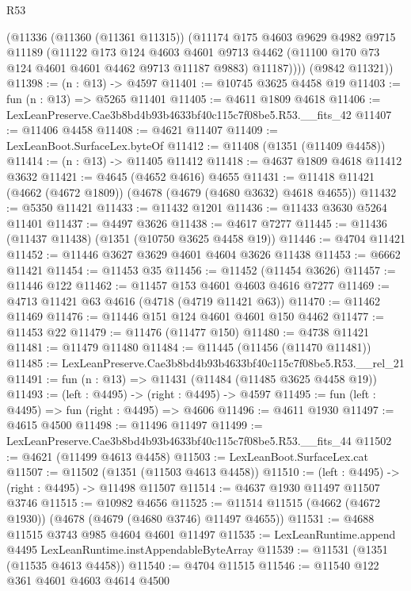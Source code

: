 \begin{lexlean}{R53}
\begin{coremodule}
        (@11336
          (@11360 (@11361 @11315))
          (@11174
            @175
            @4603
            @9629
            @4982
            @9715
            @11189
            (@11122
              @173
              @124
              @4603
              @4601
              @9713
              @4462
              (@11100 @170 @73 @124 @4601 @4601 @4462 @9713 @11187 @9883)
              @11187))))
      (@9842 @11321))
@11398 := (n : @13) -> @4597
@11401 := @10745 @3625 @4458 @19
@11403 := fun (n : @13) => @5265 @11401
@11405 := @4611 @1809 @4618
@11406 := LexLeanPreserve.Cae3b8bd4b93b4633bf40c115c7f08be5.R53.__fits_42
@11407 := @11406 @4458
@11408 := @4621 @11407
@11409 := LexLeanBoot.SurfaceLex.byteOf
@11412 := @11408 (@1351 (@11409 @4458))
@11414 := (n : @13) -> @11405 @11412
@11418 := @4637 @1809 @4618 @11412 @3632
@11421 := @4645 (@4652 @4616) @4655
@11431 := @11418 @11421 (@4662 (@4672 @1809)) (@4678 (@4679 (@4680 @3632) @4618 @4655))
@11432 := @5350 @11421
@11433 := @11432 @1201
@11436 := @11433 @3630 @5264 @11401
@11437 := @4497 @3626
@11438 := @4617 @7277
@11445 := @11436 (@11437 @11438) (@1351 (@10750 @3625 @4458 @19))
@11446 := @4704 @11421
@11452 := @11446 @3627 @3629 @4601 @4604 @3626 @11438
@11453 := @6662 @11421
@11454 := @11453 @35
@11456 := @11452 (@11454 @3626)
@11457 := @11446 @122
@11462 := @11457 @153 @4601 @4603 @4616 @7277
@11469 := @4713 @11421 @63 @4616 (@4718 (@4719 @11421 @63))
@11470 := @11462 @11469
@11476 := @11446 @151 @124 @4601 @4601 @150 @4462
@11477 := @11453 @22
@11479 := @11476 (@11477 @150)
@11480 := @4738 @11421
@11481 := @11479 @11480
@11484 := @11445 (@11456 (@11470 @11481))
@11485 := LexLeanPreserve.Cae3b8bd4b93b4633bf40c115c7f08be5.R53.__rel_21
@11491 := fun (n : @13) => @11431 (@11484 (@11485 @3625 @4458 @19))
@11493 := (left : @4495) -> (right : @4495) -> @4597
@11495 := fun (left : @4495) => fun (right : @4495) => @4606
@11496 := @4611 @1930
@11497 := @4615 @4500
@11498 := @11496 @11497
@11499 := LexLeanPreserve.Cae3b8bd4b93b4633bf40c115c7f08be5.R53.__fits_44
@11502 := @4621 (@11499 @4613 @4458)
@11503 := LexLeanBoot.SurfaceLex.cat
@11507 := @11502 (@1351 (@11503 @4613 @4458))
@11510 := (left : @4495) -> (right : @4495) -> @11498 @11507
@11514 := @4637 @1930 @11497 @11507 @3746
@11515 := @10982 @4656
@11525 := @11514 @11515 (@4662 (@4672 @1930)) (@4678 (@4679 (@4680 @3746) @11497 @4655))
@11531 := @4688 @11515 @3743 @985 @4604 @4601 @11497
@11535 := LexLeanRuntime.append @4495 LexLeanRuntime.instAppendableByteArray
@11539 := @11531 (@1351 (@11535 @4613 @4458))
@11540 := @4704 @11515
@11546 := @11540 @122 @361 @4601 @4603 @4614 @4500

\end{coremodule}
\end{lexlean}
